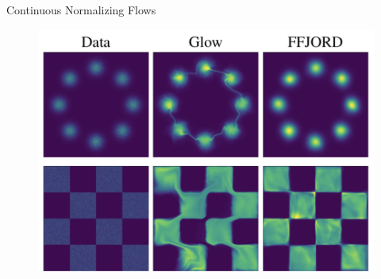 \begin{frame}{Continuous Normalizing Flows}
\begin{minipage}[t]{0.4\columnwidth}
\begin{figure}
		\end{figure}
	\end{minipage}%
	\begin{minipage}[t]{0.6\columnwidth}
		\begin{figure}
			  \centering
			  \includegraphics[width=0.8\linewidth]{figs/ffjord.png}
		\end{figure}
	\end{minipage}
\end{frame}
